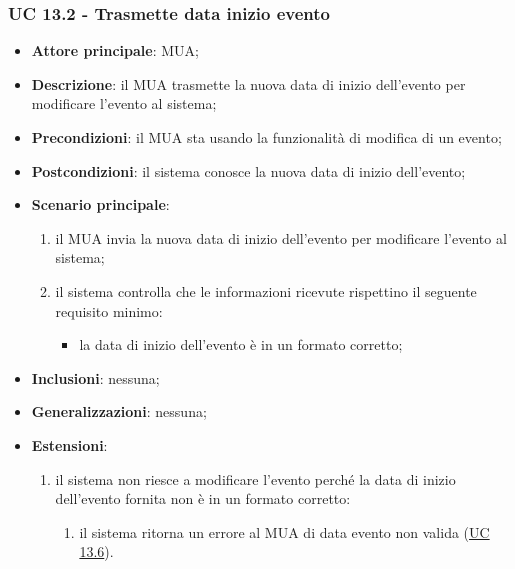     \subsubsection{UC 13.2 - Trasmette data inizio evento} \label{sec:UC13.2}
    \begin{itemize}
        \item \textbf{Attore principale}: MUA;
        \item \textbf{Descrizione}: il MUA trasmette la nuova data di inizio dell'evento per modificare l'evento al sistema;
        \item \textbf{Precondizioni}: il MUA sta usando la funzionalità di modifica di un evento;
        \item \textbf{Postcondizioni}: il sistema conosce la nuova data di inizio dell'evento;
        \item \textbf{Scenario principale}:
            \begin{enumerate}
                \item il MUA invia la nuova data di inizio dell'evento per modificare l'evento al sistema;
                \item il sistema controlla che le informazioni ricevute rispettino il seguente requisito minimo:
                    \begin{itemize}
                        \item la data di inizio dell'evento è in un formato corretto;
                    \end{itemize}
            \end{enumerate}
        \item \textbf{Inclusioni}: nessuna;
        \item \textbf{Generalizzazioni}: nessuna;
        \item \textbf{Estensioni}:
            \begin{enumerate}[label=\alph*.]
                \item il sistema non riesce a modificare l'evento perché la data di inizio dell'evento fornita non è in un formato corretto:
                \begin{enumerate}[label=\arabic*.]
                    \item il sistema ritorna un errore al MUA di data evento non valida (\hyperref[sec:UC13.6]{UC 13.6}).
                \end{enumerate}
            \end{enumerate}
    \end{itemize}


